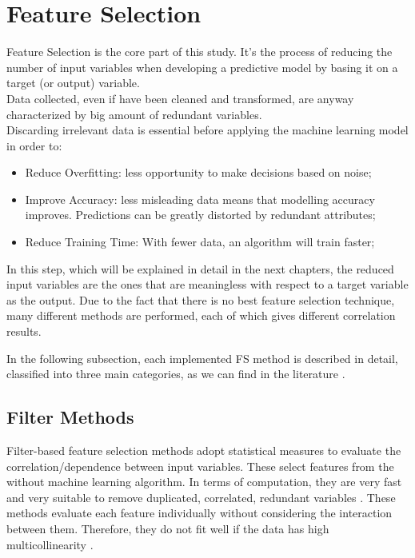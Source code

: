 \section{Feature Selection}
Feature Selection is the core part of this study. It's the process of reducing the number of input variables when developing a predictive model by basing it on a target (or output) variable. \\
Data collected, even if have been cleaned and transformed, are anyway characterized by big amount of redundant variables.\\
Discarding irrelevant data is essential before applying the machine learning model in order to:
\begin{itemize}
\item Reduce Overfitting: less opportunity to make decisions based on noise;
\item Improve Accuracy: less misleading data means that modelling accuracy improves. Predictions can be greatly distorted by redundant attributes;
\item Reduce Training Time: With fewer data, an algorithm will train faster;
\end{itemize}
In this step, which will be explained in detail in the next chapters, the reduced input variables are the ones that are meaningless with respect to a target variable as the output. \newline
Due to the fact that there is no best feature selection technique, many different methods are performed, each of which gives different correlation results.\par
In the following subsection, each implemented FS method is described in detail, classified into three main categories, as we can find in the literature \cite{stanczyk2015feature}.
\subsection{Filter Methods}
Filter-based feature selection methods adopt statistical measures to evaluate the correlation/dependence between input variables.\newline
These select features from the without machine learning algorithm. In terms of computation, they are very fast and very suitable to remove duplicated, correlated, redundant variables \cite{saeys2007review}. \newline
These methods evaluate each feature individually without considering the interaction between them. Therefore, they do not fit well if the data has high multicollinearity \cite{daoud2017multicollinearity}.


